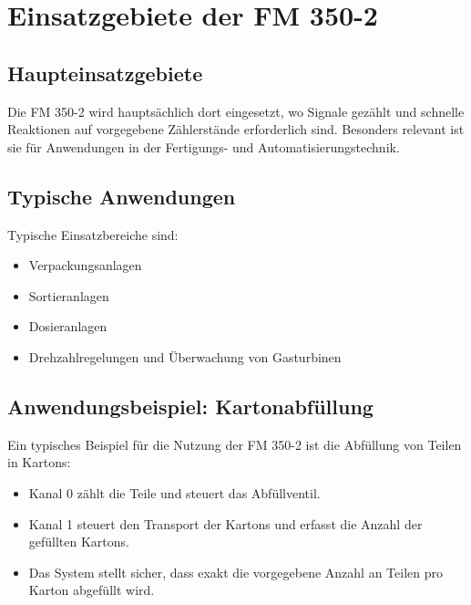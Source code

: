 \section{Einsatzgebiete der FM 350-2}

\subsection{Haupteinsatzgebiete}

Die FM 350-2 wird hauptsächlich dort eingesetzt, wo Signale gezählt und schnelle Reaktionen auf vorgegebene Zählerstände erforderlich sind. Besonders relevant ist sie für Anwendungen in der Fertigungs- und Automatisierungstechnik.

\subsection{Typische Anwendungen}

Typische Einsatzbereiche sind:
\begin{itemize}
    \item Verpackungsanlagen
    \item Sortieranlagen
    \item Dosieranlagen
    \item Drehzahlregelungen und Überwachung von Gasturbinen
\end{itemize}

\subsection{Anwendungsbeispiel: Kartonabfüllung}

Ein typisches Beispiel für die Nutzung der FM 350-2 ist die Abfüllung von Teilen in Kartons:

\begin{itemize}
    \item Kanal 0 zählt die Teile und steuert das Abfüllventil.
    \item Kanal 1 steuert den Transport der Kartons und erfasst die Anzahl der gefüllten Kartons.
    \item Das System stellt sicher, dass exakt die vorgegebene Anzahl an Teilen pro Karton abgefüllt wird.
\end{itemize}

